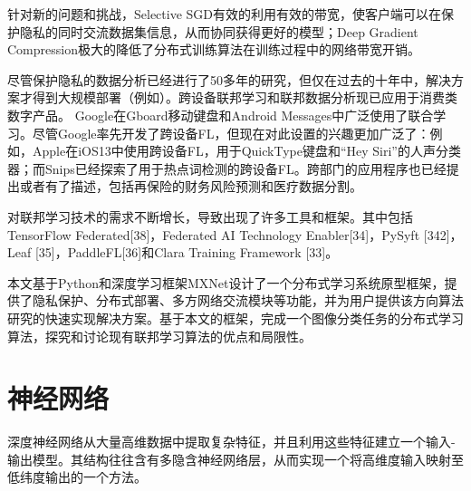 \documentclass[zihao = -4,cn]{oucart}
\begin{document}
针对新的问题和挑战，Selective SGD\cite{shokri2015privacy}有效的利用有效的带宽，使客户端可以在保护隐私的同时交流数据集信息，从而协同获得更好的模型；Deep Gradient Compression\cite{lin2017deep}极大的降低了分布式训练算法在训练过程中的网络带宽开销。\par
尽管保护隐私的数据分析已经进行了50多年的研究，但仅在过去的十年中，解决方案才得到大规模部署（例如\cite{erlingsson2014rappor}\cite{appleai}）。跨设备联邦学习和联邦数据分析现已应用于消费类数字产品。  Google在Gboard移动键盘\cite{chen2019federated}\cite{hard2018federated}\cite{ramaswamy2019federated}\cite{yang2018applied}和Android Messages中广泛使用了联合学习。尽管Google率先开发了跨设备FL，但现在对此设置的兴趣更加广泛了：例如，Apple在iOS13\cite{Apple}中使用跨设备FL，用于QuickType键盘和“Hey Siri”的人声分类器；而Snips已经探索了用于热点词检测的跨设备FL\cite{leroy2019federated}。跨部门的应用程序也已经提出或者有了描述，包括再保险的财务风险预测\cite{Webank}和医疗数据分割\cite{courtiol2019deep}。\par
对联邦学习技术的需求不断增长，导致出现了许多工具和框架。其中包括TensorFlow Federated[38]，Federated AI Technology Enabler[34]，PySyft [342]，Leaf [35]，PaddleFL[36]和Clara Training Framework [33]。\par
本文基于Python和深度学习框架MXNet设计了一个分布式学习系统原型框架，提供了隐私保护、分布式部署、多方网络交流模块等功能，并为用户提供该方向算法研究的快速实现解决方案。基于本文的框架，完成一个图像分类任务的分布式学习算法，探究和讨论现有联邦学习算法的优点和局限性。\par

\section{神经网络}
深度神经网络从大量高维数据中提取复杂特征，并且利用这些特征建立一个输入-输出模型。其结构往往含有多隐含神经网络层，从而实现一个将高维度输入映射至低纬度输出的一个方法。
\end{document}
